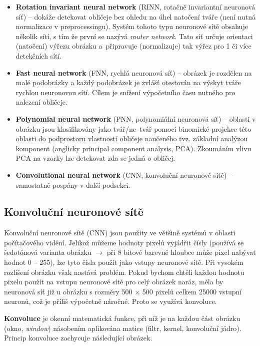 \begin{itemize}
  \item \textbf{Rotation invariant neural network} (RINN, rotačně invariantní neuronová síť) -- dokáže detekovat obličeje bez ohledu na úhel natočení tváře (není nutná normalizace v preprocessingu). Systém tohoto typu neuronové sítě obsahuje několik sítí, s tím že první se nazývá \emph{router network}. Tato síť určuje orientaci (natočení) výřezu obrázku a~připravuje (normalizuje) tak výřez pro 1 či více detekčních sítí.
  \item \textbf{Fast neural network} (FNN, rychlá neuronová síť) -- obrázek je rozdělen na malé podobrázky a každý podobrázek je zvlášť otestován na výskyt tváře rychlou neuronovou sítí. Cílem je snížení výpočetního času nutného pro nalezení obličeje.
  \item \textbf{Polynomial neural network} (PNN, polynomiální neuronová síť) -- oblasti v obrázku jsou klasifikovány jako tvář/ne--tvář pomocí binomické projekce této oblasti do podprostoru vlastností obličeje naučeného tvz. základní analýzou komponent (anglicky principal component analysis, PCA). Zkoumáním vlivu PCA na vzorky lze detekovat zda se jedná o obličej.
  \item \textbf{Convolutional neural network} (CNN, konvoluční neuronové sítě) -- samostatně pospány v další podsekci. 
\end{itemize}


\subsection*{Konvoluční neuronové sítě}
Konvoluční neuronové sítě (CNN) \cite{cnnNlp, cnnCv, cnnIntro} jsou použity ve většině systémů v oblasti počítačového vidění. Jelikož můžeme hodnoty pixelů vyjádřit čísly (používá se šedotónová varianta obrázku $\rightarrow$ při 8 bitové barevné hloubce může pixel nabývat hodnot 0 -- 255), lze tyto čísla použít jako vstupy neuronové sítě. Při vysokém rozlišení obrázku však nastává problém. Pokud bychom chtěli každou hodnotu pixelu použít na vstupu neuronové sítě pro celý obrázek naráz, měla by neuronová síť již u obrázku s rozměry 500 $\times$ 500 pixelů celkem 25000 vstupní neuronů, což je příliš výpočetně náročné. Proto se využívá konvoluce.

\textbf{Konvoluce} je okenní matematická funkce, při níž je na každou část obrázku (okno, \emph{window}) násobením aplikována matice (filtr, kernel, konvoluční jádro). Princip konvoluce zachycuje následující obrázek.

